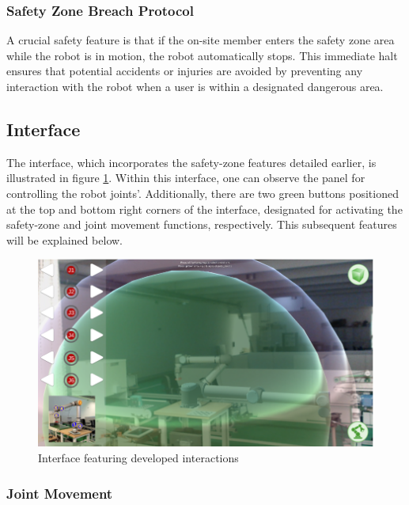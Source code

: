         \subsubsection{Safety Zone Breach Protocol}

            A crucial safety feature is that if the on-site member enters the safety zone area while the robot is in motion, the robot 
            automatically stops. This immediate halt ensures that potential accidents or injuries are avoided by preventing any interaction 
            with the robot when a user is within a designated dangerous area.
                
    \subsection{Interface}

        The interface, which incorporates the safety-zone features detailed earlier, is illustrated in figure \ref{fig: interface}. 
        Within this interface, one can observe the panel for controlling the robot joints'. Additionally, there are two green buttons 
        positioned at the top and bottom right corners of the interface, designated for activating the safety-zone and joint movement functions, 
        respectively. This subsequent features will be explained below.

        \begin{figure}[h]
            \centering
            \includegraphics[width=1\linewidth]{figs/interface.png}
            \caption{Interface featuring developed interactions}
            \label{fig: interface}
        \end{figure}

        \subsubsection{Joint Movement}


